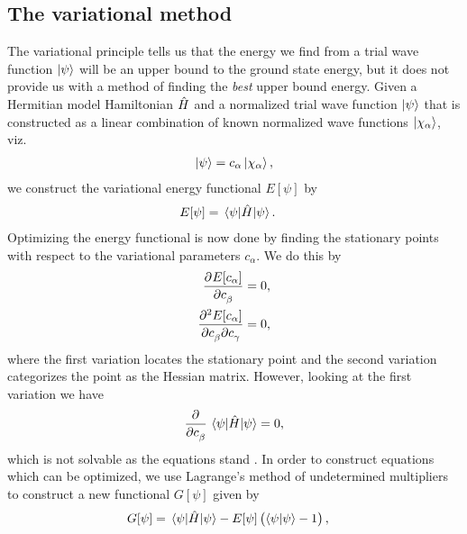         \subsection{The variational method}
            The variational principle tells us that the energy we find from a
            trial wave function $\ket{\psi}$ will be an upper bound to the
            ground state energy, but it does not provide us with a method of
            finding the \emph{best} upper bound energy.
            Given a Hermitian model Hamiltonian $\hat{H}$ and a normalized trial
            wave function $\ket{\psi}$ that is constructed as a linear
            combination of known normalized wave functions
            $\ket{\chi_{\alpha}}$, viz.
            \begin{align}
                \ket{\psi} = c_{\alpha}\ket{\chi_{\alpha}},
            \end{align}
            we construct the variational energy functional $E[\psi]$ by
            \begin{align}
                E[\psi]
                &= \mel{\psi}{\hat{H}}{\psi}.
            \end{align}
            Optimizing the energy functional is now done by finding the
            stationary points with respect to the variational parameters
            $c_{\alpha}$.
            We do this by
            \begin{align}
                \dpd[]{E[c_{\alpha}]}{c_{\beta}} &= 0,
                \\
                \dmd{E[c_{\alpha}]}{2}{c_{\beta}}{}{c_{\gamma}}{} &= 0,
            \end{align}
            where the first variation locates the stationary point and the
            second variation categorizes the point as the Hessian matrix.
            However, looking at the first variation we have
            \begin{align}
                \dpd{}{c_{\beta}}\mel{\psi}{\hamil}{\psi} = 0,
            \end{align}
            which is not solvable as the equations stand \cite{szabo1996modern}.
            In order to construct equations which can be optimized, we use
            Lagrange's method of undetermined multipliers to construct a new
            functional $G[\psi]$ given by \cite{helgaker-molecular,
            szabo1996modern}
            \begin{align}
                G[\psi]
                &=
                \mel{\psi}{\hat{H}}{\psi}
                - E[\psi] \left( \braket{\psi}{\psi} - 1 \right),
            \end{align}
